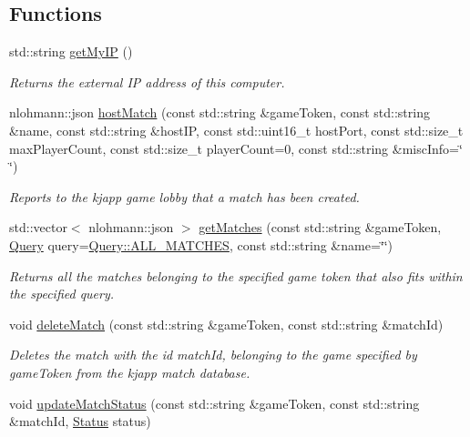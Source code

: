 \subsection*{Functions}
\begin{DoxyCompactItemize}
\item 
std\+::string \hyperlink{namespacekjapp_a60bf27524c6562d2eca46d8d2498aab4}{get\+My\+IP} ()
\begin{DoxyCompactList}\small\item\em Returns the external IP address of this computer. \end{DoxyCompactList}\item 
nlohmann\+::json \hyperlink{namespacekjapp_a22cf098842afd3b77a7c8635c26a7f95}{host\+Match} (const std\+::string \&game\+Token, const std\+::string \&name, const std\+::string \&host\+IP, const std\+::uint16\+\_\+t host\+Port, const std\+::size\+\_\+t max\+Player\+Count, const std\+::size\+\_\+t player\+Count=0, const std\+::string \&misc\+Info=\char`\"{} \char`\"{})
\begin{DoxyCompactList}\small\item\em Reports to the kjapp game lobby that a match has been created. \end{DoxyCompactList}\item 
std\+::vector$<$ nlohmann\+::json $>$ \hyperlink{namespacekjapp_a8eb2ba8b8328013a3e48b4427f602c8e}{get\+Matches} (const std\+::string \&game\+Token, \hyperlink{namespacekjapp_a98b9b721617fe3ae75dd6f92507d2121}{Query} query=\hyperlink{namespacekjapp_a98b9b721617fe3ae75dd6f92507d2121a446d73d3d33c027a52dea354cbb89f6a}{Query\+::\+A\+L\+L\+\_\+\+M\+A\+T\+C\+H\+ES}, const std\+::string \&name=\char`\"{}\char`\"{})
\begin{DoxyCompactList}\small\item\em Returns all the matches belonging to the specified game token that also fits within the specified query. \end{DoxyCompactList}\item 
void \hyperlink{namespacekjapp_afb16af4f3688ee259d2dad309ce65e9c}{delete\+Match} (const std\+::string \&game\+Token, const std\+::string \&match\+Id)
\begin{DoxyCompactList}\small\item\em Deletes the match with the id match\+Id, belonging to the game specified by game\+Token from the kjapp match database. \end{DoxyCompactList}\item 
void \hyperlink{namespacekjapp_aab9e24c5c8377e6ea59e261573a8886c}{update\+Match\+Status} (const std\+::string \&game\+Token, const std\+::string \&match\+Id, \hyperlink{namespacekjapp_a424e0b2658aa21768d94092bc8155d5e}{Status} status)

\end{DoxyCompactItemize}
